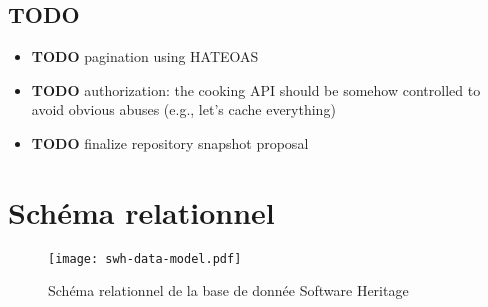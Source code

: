 \subsection{TODO}\label{todo}

\begin{itemize}
\itemsep1pt\parskip0pt
\item
  \textbf{TODO} pagination using HATEOAS
\item
  \textbf{TODO} authorization: the cooking API should be somehow
  controlled to avoid obvious abuses (e.g., let's cache everything)
\item
  \textbf{TODO} finalize repository snapshot proposal
\end{itemize}

\section{Schéma relationnel}\label{annexe-db}

\begin{figure}
\texttt{[image: swh-data-model.pdf]}
\caption{Schéma relationnel de la base de donnée Software Heritage}
\end{figure}
